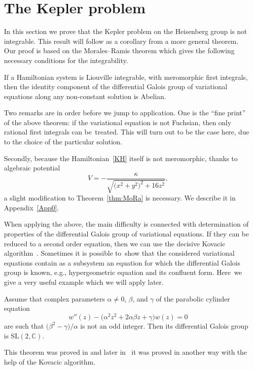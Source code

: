 \section{The Kepler problem}

In this section we prove that the Kepler problem on the Heisenberg group is not integrable.
This result will follow as a corollary from a more general theorem.
Our proof is based on the Morales--Ramis theorem \cite{Morales:01::b1} which gives
the following necessary conditions for the integrability.
\begin{Theorem} \label{thm:MoRa}
 If a Hamiltonian system is Liouville integrable, with meromorphic
 first integrals, then the identity component of the differential
 Galois group of variational equations along any non-constant
 solution is Abelian.
\end{Theorem}

Two remarks are in order before we jump to application. One is the
``fine print'' of the above theorem: if the variational equation is
not Fuchsian, then only rational first integrals can be~treated. This
will turn out to be the case here, due to the choice of the particular
solution.

Secondly, because the Hamiltonian~\eqref{KH} itself is not
meromorphic, thanks to algebraic potential
\begin{equation*} %
 V= - \frac{\kappa}{\sqrt{\big(x^2+y^2\big)^2+{16}z^2}},
\end{equation*}
a slight modification to Theorem~\ref{thm:MoRa} is necessary. We describe it in Appendix~\ref{App0}.

When applying the above, the main difficulty is connected
with determination of properties of the differential Galois group of
variational equations. If they can be reduced to a second order equation, then we can use the decisive Kovacic
algorithm~\cite{3}. Sometimes it is possible to~show that the
considered variational equations contain as a subsystem an equation
for which the differential Galois group is known, e.g., hypergeometric
equation and its confluent form. Here~we give a very useful example
which we will apply later.
\begin{Theorem}[H.P.~Rehm, 1979] \label{thm:par}
 Assume that complex parameters $\alpha\neq 0$, $\beta$, and $\gamma$
 of the parabolic cylinder equation
 \begin{equation} \label{eq:5}
 w''(z) - \big(\alpha^2 z^2 +2 \alpha \beta z + \gamma\big) w(z)=0
 \end{equation}
 are such that $\big(\beta^2-\gamma\big)/\alpha$ is not an odd integer. Then
 its differential Galois group is $\mathrm{SL}(2,\mathbb{C})$.
\end{Theorem}
This theorem was proved in \cite{Rehm} and later in~\cite{baby} it was
proved in another way with the help of the Kovacic algorithm.
